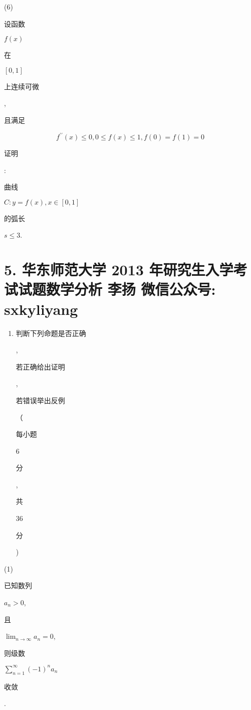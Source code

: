 \documentclass[10pt]{article}
\begin{document}
(6) \begin{CJK}{UTF8}{mj}设函数\end{CJK} $f(x)$ \begin{CJK}{UTF8}{mj}在\end{CJK} $[0,1]$ \begin{CJK}{UTF8}{mj}上连续可微\end{CJK}, \begin{CJK}{UTF8}{mj}且满足\end{CJK}
$$
f^{\prime \prime}(x) \leq 0,0 \leq f(x) \leq 1, f(0)=f(1)=0
$$
\begin{CJK}{UTF8}{mj}证明\end{CJK}: \begin{CJK}{UTF8}{mj}曲线\end{CJK} $C: y=f(x), x \in[0,1]$ \begin{CJK}{UTF8}{mj}的弧长\end{CJK} $s \leq 3$.

\section{5. 华东师范大学 2013 年研究生入学考试试题数学分析 
 李扬 
 微信公众号: sxkyliyang}
\begin{enumerate}
  \item \begin{CJK}{UTF8}{mj}判断下列命题是否正确\end{CJK}, \begin{CJK}{UTF8}{mj}若正确给出证明\end{CJK}, \begin{CJK}{UTF8}{mj}若错误举出反例\end{CJK}（\begin{CJK}{UTF8}{mj}每小题\end{CJK} 6 \begin{CJK}{UTF8}{mj}分\end{CJK}, \begin{CJK}{UTF8}{mj}共\end{CJK} 36 \begin{CJK}{UTF8}{mj}分\end{CJK})
\end{enumerate}
(1) \begin{CJK}{UTF8}{mj}已知数列\end{CJK} $a_{n}>0$, \begin{CJK}{UTF8}{mj}且\end{CJK} $\lim _{n \rightarrow \infty} a_{n}=0$, \begin{CJK}{UTF8}{mj}则级数\end{CJK} $\sum_{n=1}^{\infty}(-1)^{n} a_{n}$ \begin{CJK}{UTF8}{mj}收敛\end{CJK}.
\end{document}
